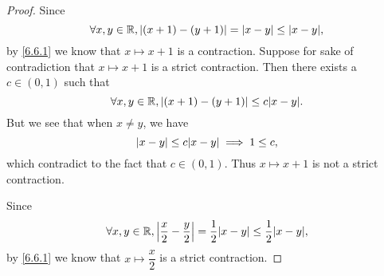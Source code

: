 \begin{proof}
  Since
  \[
    \forall x, y \in \R, \abs{(x + 1) - (y + 1)} = \abs{x - y} \leq \abs{x - y},
  \]
  by \cref{6.6.1} we know that \(x \mapsto x + 1\) is a contraction.
  Suppose for sake of contradiction that \(x \mapsto x + 1\) is a strict contraction.
  Then there exists a \(c \in (0, 1)\) such that
  \[
    \forall x, y \in \R, \abs{(x + 1) - (y + 1)} \leq c \abs{x - y}.
  \]
  But we see that when \(x \neq y\), we have
  \[
    \abs{x - y} \leq c \abs{x - y} \implies 1 \leq c,
  \]
  which contradict to the fact that \(c \in (0, 1)\).
  Thus \(x \mapsto x + 1\) is not a strict contraction.

  Since
  \[
    \forall x, y \in \R, \abs{\dfrac{x}{2} - \dfrac{y}{2}} = \dfrac{1}{2} \abs{x - y} \leq \dfrac{1}{2} \abs{x - y},
  \]
  by \cref{6.6.1} we know that \(x \mapsto \dfrac{x}{2}\) is a strict contraction.


\end{proof}

